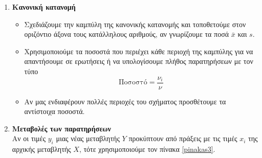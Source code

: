 \documentclass[a4paper,11pt]{article}
\begin{document}
\begin{enumerate}[label=\bf\thesection.\arabic*.]
\begin{itemize}
\end{itemize}
\item\textbf{Κανονική κατανομή}
\begin{itemize}
\item Σχεδιάζουμε την καμπύλη της κανονικής κατανομής και τοποθετούμε στον οριζόντιο άξονα τους κατάλληλους αριθμούς, αν γνωρίζουμε τα ποσά $\bar{x}$ και $s$.
\item Χρησιμοποιούμε τα ποσοστά που περιέχει κάθε περιοχή της καμπύλης για να απαντήσουμε σε ερωτήσεις ή να υπολογίσουμε πλήθος παρατηρήσεων με τον τύπο
\[ \textrm{Ποσοστό}=\frac{\nu_i}{\nu} \]
\item Αν μας ενδιαφέρουν πολλές περιοχές του σχήματος προσθέτουμε τα αντίστοιχα ποσοστά.
\end{itemize}
\item\textbf{Μεταβολές των παρατηρήσεων}\\
Αν οι τιμές $y_i$ μιας νέας μεταβλητής $Y$ προκύπτουν από πράξεις με τις τιμές $x_i$ της αρχικής μεταβλητής $X$, τότε χρησιμοποιούμε τον πίνακα \ref{pinakas3}.
\end{enumerate}
\end{document}
